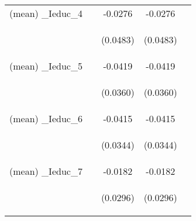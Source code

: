\documentclass[]{article}
\begin{document}
\begin{center}
\begin{tabular}{lcccc}
(mean) \_Ieduc\_4 &  & -0.0276 & -0.0276 &  \\
\vspace{4pt} & \begin{footnotesize}\end{footnotesize} & \begin{footnotesize}(0.0483)\end{footnotesize} & \begin{footnotesize}(0.0483)\end{footnotesize} & \begin{footnotesize}\end{footnotesize} \\
(mean) \_Ieduc\_5 &  & -0.0419 & -0.0419 &  \\
\vspace{4pt} & \begin{footnotesize}\end{footnotesize} & \begin{footnotesize}(0.0360)\end{footnotesize} & \begin{footnotesize}(0.0360)\end{footnotesize} & \begin{footnotesize}\end{footnotesize} \\
(mean) \_Ieduc\_6 &  & -0.0415 & -0.0415 &  \\
\vspace{4pt} & \begin{footnotesize}\end{footnotesize} & \begin{footnotesize}(0.0344)\end{footnotesize} & \begin{footnotesize}(0.0344)\end{footnotesize} & \begin{footnotesize}\end{footnotesize} \\
(mean) \_Ieduc\_7 &  & -0.0182 & -0.0182 &  \\
\vspace{4pt} & \begin{footnotesize}\end{footnotesize} & \begin{footnotesize}(0.0296)\end{footnotesize} & \begin{footnotesize}(0.0296)\end{footnotesize} & \begin{footnotesize}\end{footnotesize} \\

\end{tabular}
\end{center}
\end{document}
